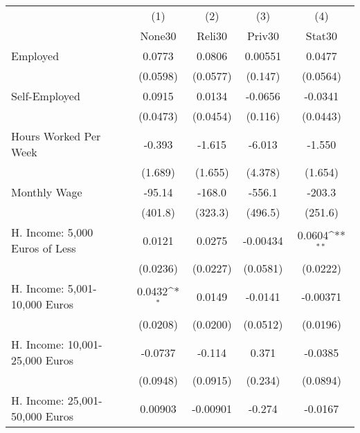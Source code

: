{
\def\sym#1{\ifmmode^{#1}\else\(^{#1}\)\fi}
\begin{tabular}{l*{4}{c}}
\hline\hline
            &\multicolumn{1}{c}{(1)}&\multicolumn{1}{c}{(2)}&\multicolumn{1}{c}{(3)}&\multicolumn{1}{c}{(4)}\\
            &\multicolumn{1}{c}{None30}&\multicolumn{1}{c}{Reli30}&\multicolumn{1}{c}{Priv30}&\multicolumn{1}{c}{Stat30}\\
\hline
Employed    &      0.0773         &      0.0806         &     0.00551         &      0.0477         \\
            &    (0.0598)         &    (0.0577)         &     (0.147)         &    (0.0564)         \\
[1em]
Self-Employed&      0.0915         &      0.0134         &     -0.0656         &     -0.0341         \\
            &    (0.0473)         &    (0.0454)         &     (0.116)         &    (0.0443)         \\
[1em]
Hours Worked Per Week&      -0.393         &      -1.615         &      -6.013         &      -1.550         \\
            &     (1.689)         &     (1.655)         &     (4.378)         &     (1.654)         \\
[1em]
Monthly Wage&      -95.14         &      -168.0         &      -556.1         &      -203.3         \\
            &     (401.8)         &     (323.3)         &     (496.5)         &     (251.6)         \\
[1em]
H. Income: 5,000 Euros of Less&      0.0121         &      0.0275         &    -0.00434         &      0.0604\sym{**} \\
            &    (0.0236)         &    (0.0227)         &    (0.0581)         &    (0.0222)         \\
[1em]
H. Income: 5,001-10,000 Euros&      0.0432\sym{*}  &      0.0149         &     -0.0141         &    -0.00371         \\
            &    (0.0208)         &    (0.0200)         &    (0.0512)         &    (0.0196)         \\
[1em]
H. Income: 10,001-25,000 Euros&     -0.0737         &      -0.114         &       0.371         &     -0.0385         \\
            &    (0.0948)         &    (0.0915)         &     (0.234)         &    (0.0894)         \\
[1em]
H. Income: 25,001-50,000 Euros&     0.00903         &    -0.00901         &      -0.274         &     -0.0167         \\

\end{tabular}}
